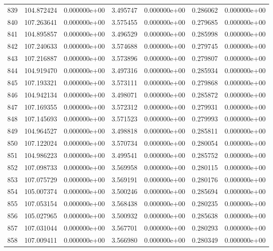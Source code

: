 \begin{tabular}{rrrrrrr}
 839 & 104.872424 &  0.000000e+00 &  3.495747 &  0.000000e+00 &    0.286062 &  0.000000e+00 \\
 840 & 107.263641 &  0.000000e+00 &  3.575455 &  0.000000e+00 &    0.279685 &  0.000000e+00 \\
 841 & 104.895857 &  0.000000e+00 &  3.496529 &  0.000000e+00 &    0.285998 &  0.000000e+00 \\
 842 & 107.240633 &  0.000000e+00 &  3.574688 &  0.000000e+00 &    0.279745 &  0.000000e+00 \\
 843 & 107.216887 &  0.000000e+00 &  3.573896 &  0.000000e+00 &    0.279807 &  0.000000e+00 \\
 844 & 104.919470 &  0.000000e+00 &  3.497316 &  0.000000e+00 &    0.285934 &  0.000000e+00 \\
 845 & 107.193321 &  0.000000e+00 &  3.573111 &  0.000000e+00 &    0.279868 &  0.000000e+00 \\
 846 & 104.942134 &  0.000000e+00 &  3.498071 &  0.000000e+00 &    0.285872 &  0.000000e+00 \\
 847 & 107.169355 &  0.000000e+00 &  3.572312 &  0.000000e+00 &    0.279931 &  0.000000e+00 \\
 848 & 107.145693 &  0.000000e+00 &  3.571523 &  0.000000e+00 &    0.279993 &  0.000000e+00 \\
 849 & 104.964527 &  0.000000e+00 &  3.498818 &  0.000000e+00 &    0.285811 &  0.000000e+00 \\
 850 & 107.122024 &  0.000000e+00 &  3.570734 &  0.000000e+00 &    0.280054 &  0.000000e+00 \\
 851 & 104.986223 &  0.000000e+00 &  3.499541 &  0.000000e+00 &    0.285752 &  0.000000e+00 \\
 852 & 107.098733 &  0.000000e+00 &  3.569958 &  0.000000e+00 &    0.280115 &  0.000000e+00 \\
 853 & 107.075729 &  0.000000e+00 &  3.569191 &  0.000000e+00 &    0.280176 &  0.000000e+00 \\
 854 & 105.007374 &  0.000000e+00 &  3.500246 &  0.000000e+00 &    0.285694 &  0.000000e+00 \\
 855 & 107.053154 &  0.000000e+00 &  3.568438 &  0.000000e+00 &    0.280235 &  0.000000e+00 \\
 856 & 105.027965 &  0.000000e+00 &  3.500932 &  0.000000e+00 &    0.285638 &  0.000000e+00 \\
 857 & 107.031044 &  0.000000e+00 &  3.567701 &  0.000000e+00 &    0.280293 &  0.000000e+00 \\
 858 & 107.009411 &  0.000000e+00 &  3.566980 &  0.000000e+00 &    0.280349 &  0.000000e+00 \\

\end{tabular}
